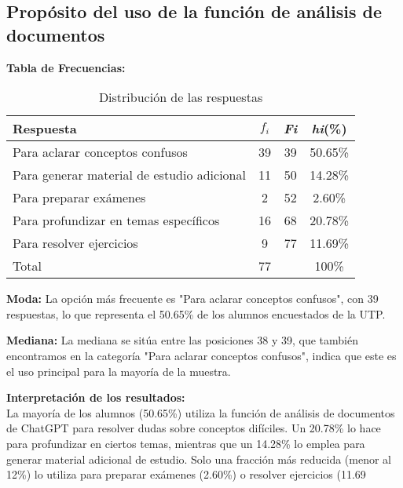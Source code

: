 \subsection{Propósito del uso de la función de análisis de documentos}
\textbf{Tabla de Frecuencias:}
\begin{table}[H]
	\centering
	\renewcommand{\arraystretch}{1.2}
	\begin{tabular}{l c c c}
		\hline
		{Respuesta} & {\(f_i\)} & \textit{Fi} & \textit{hi}(\%)\\
		\hline
		Para aclarar conceptos confusos        & 39 & 39 & 50.65\%\\
		Para generar material de estudio adicional & 11 & 50 & 14.28\%\\
		Para preparar exámenes                 & 2  & 52 & 2.60\%\\
		Para profundizar en temas específicos  & 16 & 68 & 20.78\%\\
		Para resolver ejercicios               & 9  & 77 & 11.69\%\\
		\hline
		Total                                  & 77 &    & 100\%\\
		\hline
	\end{tabular}
	\caption{Distribución de las respuestas}
	\label{tabla:analisisDeDocumentos}
\end{table}

\textbf{Moda:} La opción más frecuente es "Para aclarar conceptos confusos", con 39 respuestas, lo que representa el 50.65\% de los alumnos encuestados de la UTP.

\textbf{Mediana:} La mediana se sitúa entre las posiciones 38 y 39, que también encontramos en la categoría "Para aclarar conceptos confusos", indica que este es el uso principal para la mayoría de la muestra.

\textbf{Interpretación de los resultados:}\\
La mayoría de los alumnos (50.65\%) utiliza la función de análisis de documentos de ChatGPT para resolver dudas sobre conceptos difíciles. Un 20.78\% lo hace para profundizar en ciertos temas, mientras que un 14.28\% lo emplea para generar material adicional de estudio. Solo una fracción más reducida (menor al 12\%) lo utiliza para preparar exámenes (2.60\%) o resolver ejercicios (11.69%
